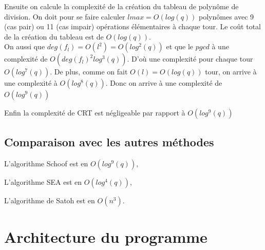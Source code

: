 \documentclass{article}%
\theoremstyle{plain}
\theoremstyle{definition}
\theoremstyle{plain}
\theoremstyle{plain}
\theoremstyle{remark}
\begin{document}
Ensuite on calcule la complexité de la création du tableau de polynôme de division.
On doit pour se faire calculer $lmax = O(log(q))$ polynômes avec 9 (cas pair) ou 11 (cas impair) opérations élémentaires à chaque tour. Le coût total de la création du tableau est de $O(log(q))$.\\


On aussi que $deg(f_{l})=O(l^{2})=O(log^{2}(q))$ et que le $pgcd$ à une complexité de $O(deg(f_{l})^{2}log^{3}(q))$.
D'où une complexité pour chaque tour $O(log^{7}(q))$.
De plus, comme on fait $O(l)=O(log(q))$ tour, on arrive à une complexité à $O(log^{8}(q))$.
Donc on arrive à une complexité de $O(log^{9}(q))$

Enfin la complexité de CRT est négligeable par rapport à $O(log^{9}(q))$

\subsection{Comparaison avec les autres méthodes}

\begin{list}{•}{}
\item L'algorithme Schoof est en $O(log^{9}(q))$,
\item L'algorithme SEA est en $O(log^{4}(q))$,
\item L'algorithme de Satoh est en $O(n^{3})$.
\end{list}



\section{Architecture du programme}
\end{document}
